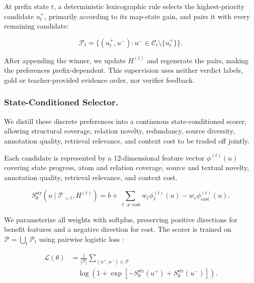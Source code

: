 \documentclass[letterpaper]{article}
\begin{document}
At prefix state $t$, a deterministic lexicographic rule selects the
highest-priority candidate $u_t^+$, primarily according to its
map-state gain, and pairs it with every remaining candidate:

\[
\mathcal P_t=
\{(u_t^+,u^-):
u^-\in\mathcal C_t\setminus\{u_t^+\}\}.
\]

After appending the winner, we update $H^{(t)}$ and regenerate the
pairs, making the preferences prefix-dependent. This supervision uses
neither verdict labels, gold or teacher-provided evidence order, nor
verifier feedback.

\subsubsection{State-Conditioned Selector.}

We distill these discrete preferences into a continuous
state-conditioned scorer, allowing structural coverage, relation
novelty, redundancy, source diversity, annotation quality, retrieval
relevance, and context cost to be traded off jointly.

Each candidate is represented by a 12-dimensional feature vector
$\phi^{(t)}(u)$ covering state progress, atom and relation coverage,
source and textual novelty, annotation quality, retrieval relevance,
and context cost.

\[
S_\theta^{\mathrm{str}}(u\mid\mathcal T_{<t},H^{(t)})
=b+\sum_{\ell\ne\mathrm{cost}}w_\ell\phi_\ell^{(t)}(u)
-w_c\phi_{\mathrm{cost}}^{(t)}(u).
\]

We parameterize all weights with softplus, preserving positive
directions for benefit features and a negative direction for cost.
The scorer is trained on
$\mathcal P=\bigcup_t\mathcal P_t$ using pairwise logistic loss
\citep{Burges2005RankNet}:

\[
\begin{aligned}
\mathcal L(\theta)
&={}\frac{1}{|\mathcal P|}
\sum_{(u^+,u^-)\in\mathcal P}\\
&\quad\log\!\left(1+\exp\!\left[
-S_\theta^{\mathrm{str}}(u^+)+S_\theta^{\mathrm{str}}(u^-)
\right]\right).
\end{aligned}
\]
\end{document}
